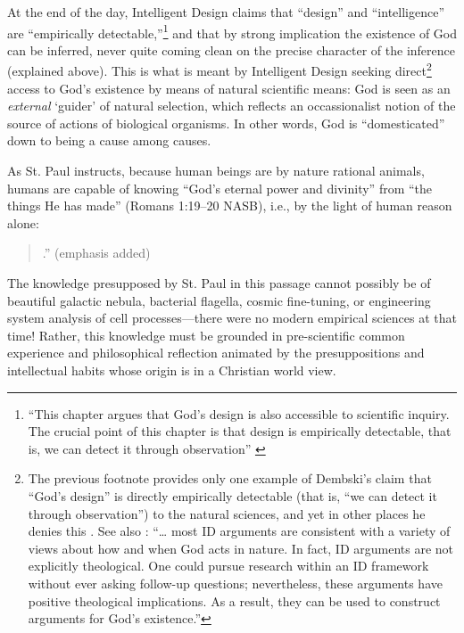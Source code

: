 At the end of the day, Intelligent Design claims that “design” and “intelligence” are “empirically detectable,”\footnote{
“This chapter argues that God’s design is also accessible to scientific inquiry. The crucial point of this chapter is that design is empirically detectable, that is, we can detect it through observation” \citep[][p.~17]{dembski2002}
} and that by strong implication the existence of God can be inferred, never quite coming clean on the precise character of the inference (explained above). This is what is meant by Intelligent Design seeking direct\footnote{
The previous footnote provides only one example of Dembski’s claim that “God’s design” is directly empirically detectable (that is, “we can detect it through observation”) to the natural sciences, and yet in other places he denies this \citep[][pp.~107--108]{dembski2002}. See also \citet[][p.~205]{richards2010c}:
“… most ID arguments are consistent with a variety of views about how and when God acts in nature. In fact, ID arguments are not explicitly theological. One could pursue research within an ID framework without ever asking follow-up questions; nevertheless, these arguments have positive theological implications. As a result, they can be used to construct arguments for God’s existence.”
} access to God’s existence by means of natural scientific means: God is seen as an \textit{external} `guider' of natural selection, which reflects an occassionalist notion of the source of actions of biological organisms. In other words, God is “domesticated” down to being a cause among causes.


As St. Paul instructs, because human beings are by nature rational animals, humans are capable of knowing ``God's eternal power and divinity'' from ``the things He has made'' (Romans 1:19--20 NASB), i.e., by the light of human reason alone:

\begin{quote}
.'' (emphasis added)
\end{quote}

The knowledge presupposed by St. Paul in this passage cannot possibly be of beautiful galactic nebula, bacterial flagella, cosmic fine-tuning, or engineering system analysis of cell processes---there were no modern empirical sciences at that time! Rather, this knowledge must be grounded in pre-scientific common experience and philosophical reflection animated by the presuppositions and intellectual habits whose origin is in a Christian world view.

